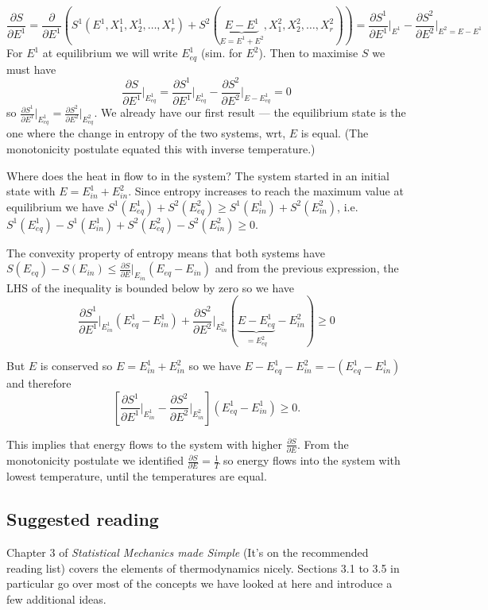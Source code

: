 \documentclass{article}
\begin{document}
$$\frac{\partial S}{\partial E^1} = \frac{\partial}{\partial E^1}\left(S^1(E^1,X_1^1,X_2^1,\ldots,X_r^1) + S^2(\underbrace{E-E^1}_{E=E^1+E^2},X_1^2,X_2^2,\ldots,X_r^2) \right) = \frac{\partial S^1}{\partial E^1}\bigg\vert_{E^1} -  \frac{\partial S^2}{\partial E^2}\bigg\vert_{E^2=E-E^1}$$
For $E^1$ at equilibrium we will write $E^1_{eq}$ (sim. for $E^2$). Then to maximise $S$ we must have
$$\frac{\partial S}{\partial E^1}\bigg\vert_{E^1_{eq}} = \frac{\partial S^1}{\partial E^1}\bigg\vert_{E^1_{eq}} - \frac{\partial S^2}{\partial E^2}\bigg\vert_{E-E^1_{eq}}=0$$
so $\frac{\partial S^1}{\partial E^1}\vert_{E^1_{eq}} = \frac{\partial S^2}{\partial E^2}\vert_{E_{eq}^2}$. We already have our first result --- the equilibrium state is the one where the change in entropy of the two systems, wrt, $E$ is equal. (The  monotonicity postulate equated this with inverse temperature.)

Where does the heat in flow to in the system? The system started in an initial state with $E = E^1_{in}+E^2_{in}$. Since entropy increases to reach the maximum  value at equilibrium we have $S^1(E^1_{eq}) + S^2(E^2_{eq}) \geq S^1(E^1_{in}) + S^2(E^2_{in})$, i.e. $ S^1(E^1_{eq}) - S^1(E^1_{in})  +  S^2(E^2_{eq}) - S^2(E^2_{in})\geq 0$.

The convexity property of entropy means that both systems have $S(E_{eq})-S(E_{in})\leq \frac{\partial S}{\partial E}\vert_{E_{in}}(E_{eq}-E_{in})$ and from the previous expression, the LHS of the inequality is bounded below by zero so we have
$$\frac{\partial S^1}{\partial E^1}\bigg\vert_{E^1_{in}}(E_{eq}^1-E_{in}^1) + \frac{\partial S^2}{\partial E^2}\bigg\vert_{E^2_{in}}(\underbrace{E-E_{eq}^1}_{=E^2_{eq}}-E_{in}^2) \geq 0$$

But $E$ is conserved so $E=E^1_{in}+E^2_{in}$ so we have $E-E^1_{eq}-E^2_{in} = -(E^1_{eq}-E^1_{in})$ and therefore
$$\left[\frac{\partial S^1}{\partial E^1}\bigg\vert_{E^1_{in}} - \frac{\partial S^2}{\partial E^2}\bigg\vert_{E^2_{in}}\right]\left(E^1_{eq}-E^1_{in}\right)\geq 0.$$

This implies that energy flows to the  system with higher $\frac{\partial S}{\partial E}$. From the monotonicity postulate we identified  $\frac{\partial S}{\partial E}= \frac{1}{T}$ so energy flows into the system with lowest temperature, until the temperatures are equal.

\subsection{Suggested reading}
Chapter 3 of \emph{Statistical Mechanics made Simple} (It's on the recommended reading list) covers the elements of thermodynamics nicely. Sections 3.1 to 3.5 in particular go over most of the concepts we have looked at here and introduce a few additional ideas.
\end{document}
